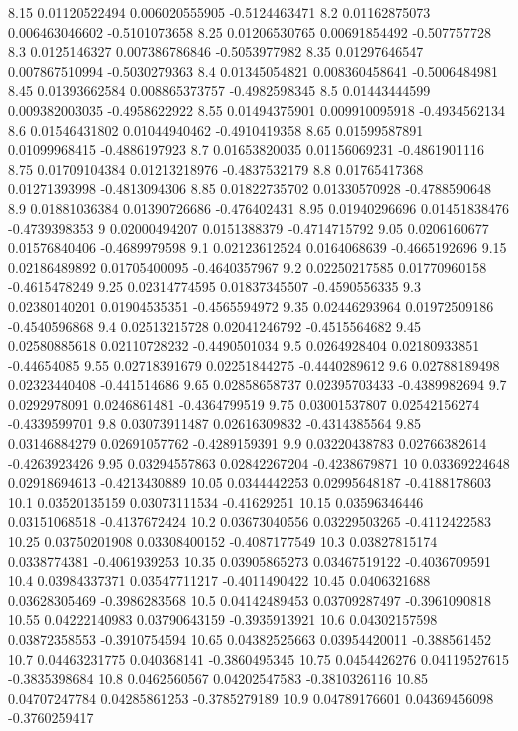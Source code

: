 {8.15 0.01120522494 0.006020555905 -0.5124463471
8.2 0.01162875073 0.006463046602 -0.5101073658
8.25 0.01206530765 0.00691854492 -0.507757728
8.3 0.0125146327 0.007386786846 -0.5053977982
8.35 0.01297646547 0.007867510994 -0.5030279363
8.4 0.01345054821 0.008360458641 -0.5006484981
8.45 0.01393662584 0.008865373757 -0.4982598345
8.5 0.01443444599 0.009382003035 -0.4958622922
8.55 0.01494375901 0.009910095918 -0.4934562134
8.6 0.01546431802 0.01044940462 -0.4910419358
8.65 0.01599587891 0.01099968415 -0.4886197923
8.7 0.01653820035 0.01156069231 -0.4861901116
8.75 0.01709104384 0.01213218976 -0.4837532179
8.8 0.01765417368 0.01271393998 -0.4813094306
8.85 0.01822735702 0.01330570928 -0.4788590648
8.9 0.01881036384 0.01390726686 -0.476402431
8.95 0.01940296696 0.01451838476 -0.4739398353
9 0.02000494207 0.0151388379 -0.4714715792
9.05 0.0206160677 0.01576840406 -0.4689979598
9.1 0.02123612524 0.0164068639 -0.4665192696
9.15 0.02186489892 0.01705400095 -0.4640357967
9.2 0.02250217585 0.01770960158 -0.4615478249
9.25 0.02314774595 0.01837345507 -0.4590556335
9.3 0.02380140201 0.01904535351 -0.4565594972
9.35 0.02446293964 0.01972509186 -0.4540596868
9.4 0.02513215728 0.02041246792 -0.4515564682
9.45 0.02580885618 0.02110728232 -0.4490501034
9.5 0.0264928404 0.02180933851 -0.44654085
9.55 0.02718391679 0.02251844275 -0.4440289612
9.6 0.02788189498 0.02323440408 -0.441514686
9.65 0.02858658737 0.02395703433 -0.4389982694
9.7 0.0292978091 0.0246861481 -0.4364799519
9.75 0.03001537807 0.02542156274 -0.4339599701
9.8 0.03073911487 0.02616309832 -0.4314385564
9.85 0.03146884279 0.02691057762 -0.4289159391
9.9 0.03220438783 0.02766382614 -0.4263923426
9.95 0.03294557863 0.02842267204 -0.4238679871
10 0.03369224648 0.02918694613 -0.4213430889
10.05 0.0344442253 0.02995648187 -0.4188178603
10.1 0.03520135159 0.03073111534 -0.41629251
10.15 0.03596346446 0.03151068518 -0.4137672424
10.2 0.03673040556 0.03229503265 -0.4112422583
10.25 0.03750201908 0.03308400152 -0.4087177549
10.3 0.03827815174 0.0338774381 -0.4061939253
10.35 0.03905865273 0.03467519122 -0.4036709591
10.4 0.03984337371 0.03547711217 -0.4011490422
10.45 0.0406321688 0.03628305469 -0.3986283568
10.5 0.04142489453 0.03709287497 -0.3961090818
10.55 0.04222140983 0.03790643159 -0.3935913921
10.6 0.04302157598 0.03872358553 -0.3910754594
10.65 0.04382525663 0.03954420011 -0.388561452
10.7 0.04463231775 0.040368141 -0.3860495345
10.75 0.0454426276 0.04119527615 -0.3835398684
10.8 0.0462560567 0.04202547583 -0.3810326116
10.85 0.04707247784 0.04285861253 -0.3785279189
10.9 0.04789176601 0.04369456098 -0.3760259417
}
